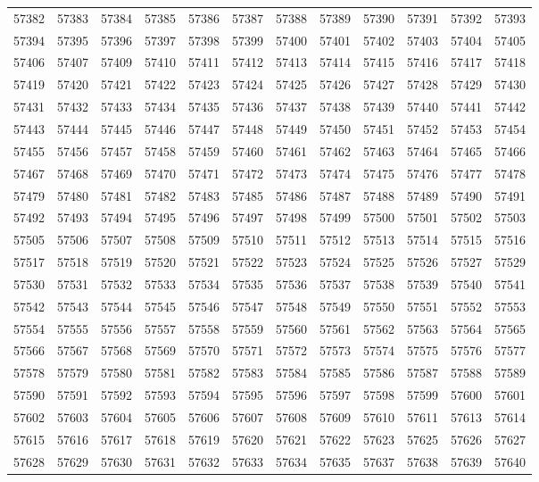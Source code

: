 \begin{center}
\begin{longtable}{llllllllllll}
57382 &57383 &57384 &57385 &57386 &57387 &57388 &57389 &57390 &57391 &57392 &57393 \\
57394 &57395 &57396 &57397 &57398 &57399 &57400 &57401 &57402 &57403 &57404 &57405 \\
57406 &57407 &57409 &57410 &57411 &57412 &57413 &57414 &57415 &57416 &57417 &57418 \\
57419 &57420 &57421 &57422 &57423 &57424 &57425 &57426 &57427 &57428 &57429 &57430 \\
57431 &57432 &57433 &57434 &57435 &57436 &57437 &57438 &57439 &57440 &57441 &57442 \\
57443 &57444 &57445 &57446 &57447 &57448 &57449 &57450 &57451 &57452 &57453 &57454 \\
57455 &57456 &57457 &57458 &57459 &57460 &57461 &57462 &57463 &57464 &57465 &57466 \\
57467 &57468 &57469 &57470 &57471 &57472 &57473 &57474 &57475 &57476 &57477 &57478 \\
57479 &57480 &57481 &57482 &57483 &57485 &57486 &57487 &57488 &57489 &57490 &57491 \\
57492 &57493 &57494 &57495 &57496 &57497 &57498 &57499 &57500 &57501 &57502 &57503 \\
57505 &57506 &57507 &57508 &57509 &57510 &57511 &57512 &57513 &57514 &57515 &57516 \\
57517 &57518 &57519 &57520 &57521 &57522 &57523 &57524 &57525 &57526 &57527 &57529 \\
57530 &57531 &57532 &57533 &57534 &57535 &57536 &57537 &57538 &57539 &57540 &57541 \\
57542 &57543 &57544 &57545 &57546 &57547 &57548 &57549 &57550 &57551 &57552 &57553 \\
57554 &57555 &57556 &57557 &57558 &57559 &57560 &57561 &57562 &57563 &57564 &57565 \\
57566 &57567 &57568 &57569 &57570 &57571 &57572 &57573 &57574 &57575 &57576 &57577 \\
57578 &57579 &57580 &57581 &57582 &57583 &57584 &57585 &57586 &57587 &57588 &57589 \\
57590 &57591 &57592 &57593 &57594 &57595 &57596 &57597 &57598 &57599 &57600 &57601 \\
57602 &57603 &57604 &57605 &57606 &57607 &57608 &57609 &57610 &57611 &57613 &57614 \\
57615 &57616 &57617 &57618 &57619 &57620 &57621 &57622 &57623 &57625 &57626 &57627 \\
57628 &57629 &57630 &57631 &57632 &57633 &57634 &57635 &57637 &57638 &57639 &57640 \\

\end{longtable}
\end{center}
